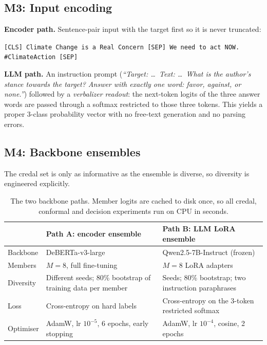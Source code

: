 \documentclass[11pt,a4paper]{article}
\begin{document}
\subsection{M3: Input encoding}\label{sec:m3}

\textbf{Encoder path.} Sentence-pair input with the target first so it is never truncated:
\begin{center}
\texttt{[CLS] Climate Change is a Real Concern [SEP] We need to act NOW. \#ClimateAction [SEP]}
\end{center}

\textbf{LLM path.} An instruction prompt (\emph{``Target: \dots\ Text: \dots\ What is the
author's stance towards the target? Answer with exactly one word: favor, against, or
none.''}) followed by a \emph{verbalizer readout}: the next-token logits of the three answer
words are passed through a softmax restricted to those three tokens. This yields a proper
3-class probability vector with no free-text generation and no parsing errors.

\subsection{M4: Backbone ensembles}\label{sec:m4}

The credal set is only as informative as the ensemble is diverse, so diversity is
engineered explicitly.

\begin{table}[ht]
\centering
\small
\begin{tabular}{l p{5.3cm} p{5.3cm}}
\toprule
& Path A: encoder ensemble & Path B: LLM LoRA ensemble \\
\midrule
Backbone & DeBERTa-v3-large~\cite{he2023} & Qwen2.5-7B-Instruct (frozen) \\
Members & $M=8$, full fine-tuning & $M=8$ LoRA adapters~\cite{hu2022,wang2023lora} \\
Diversity & Different seeds; 80\% bootstrap of training data per member &
  Seeds; 80\% bootstrap; two instruction paraphrases \\
Loss & Cross-entropy on hard labels & Cross-entropy on the 3-token restricted softmax \\
Optimiser & AdamW, lr $10^{-5}$, 6 epochs, early stopping & AdamW, lr $10^{-4}$, cosine, 2 epochs \\
\bottomrule
\end{tabular}
\caption{The two backbone paths. Member logits are cached to disk once, so all credal,
conformal and decision experiments run on CPU in seconds.}
\label{tab:ens}
\end{table}
\end{document}
